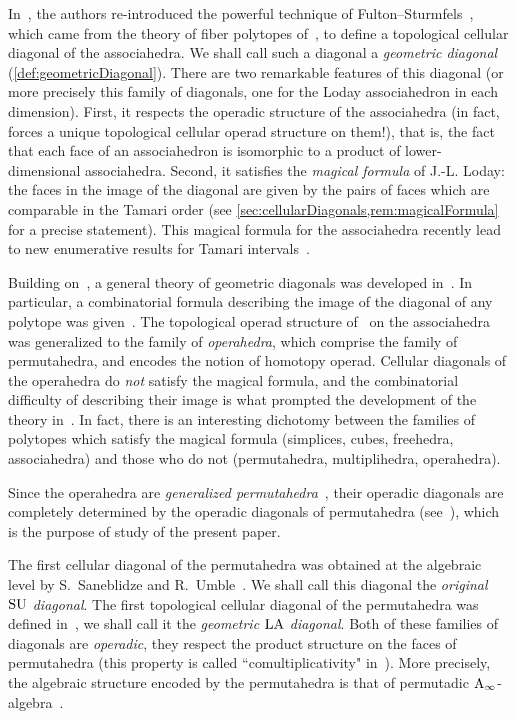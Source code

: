 In~\cite{MasudaThomasTonksVallette}, the authors re-introduced the powerful technique of Fulton--Sturmfels~\cite{FultonSturmfels}, which came from the theory of fiber polytopes of~\cite{BilleraSturmfels}, to define a topological cellular diagonal of the associahedra.
We shall call such a diagonal a \emph{geometric diagonal} (\cref{def:geometricDiagonal}).
There are two remarkable features of this diagonal (or more precisely this family of diagonals, one for the Loday associahedron in each dimension).
First, it respects the operadic structure of the associahedra (in fact, forces a unique topological cellular operad structure on them!), that is, the fact that each face of an associahedron is isomorphic to a product of lower-dimensional associahedra.
Second, it satisfies the \emph{magical formula} of J.-L. Loday: the faces in the image of the diagonal are given by the pairs of faces which are comparable in the Tamari order (see \cref{sec:cellularDiagonals,rem:magicalFormula} for a precise statement). 
This magical formula for the associahedra recently lead to new enumerative results for Tamari intervals~\cite{BostanChyzakPilaud}.

Building on~\cite{MasudaThomasTonksVallette}, a general theory of geometric diagonals was developed in~\cite{LaplanteAnfossi}.
In particular, a combinatorial formula describing the image of the diagonal of any polytope was given~\cite[Thm.~1.26]{LaplanteAnfossi}.
The topological operad structure of~\cite{MasudaThomasTonksVallette} on the associahedra was generalized to the family of \emph{operahedra}, which comprise the family of permutahedra, and encodes the notion of homotopy operad.
Cellular diagonals of the operahedra do \emph{not} satisfy the magical formula, and the combinatorial difficulty of describing their image is what prompted the development of the theory in~\cite{LaplanteAnfossi}.
In fact, there is an interesting dichotomy between the families of polytopes which satisfy the magical formula (simplices, cubes, freehedra, associahedra) and those who do not (permutahedra, multiplihedra, operahedra).

Since the operahedra are \emph{generalized permutahedra}~\cite{Postnikov}, their operadic diagonals are completely determined by the operadic diagonals of permutahedra (see~\cite[Sect.~1.6]{LaplanteAnfossi}), which is the purpose of study of the present paper.

The first cellular diagonal of the permutahedra was obtained at the algebraic level by S.~Sanebli\-dze and R.~Umble~\cite{SaneblidzeUmble}.
We shall call this diagonal the \emph{original $\mathrm{SU}$ diagonal}. 
The first topological cellular diagonal of the permutahedra was defined in~\cite{LaplanteAnfossi}, we shall call it the \emph{geometric $\mathrm{LA}$ diagonal}.
Both of these families of diagonals are \emph{operadic}, \ie they respect the product structure on the faces of permutahedra (this property is called ``comultiplicativity" in~\cite{SaneblidzeUmble}).
More precisely, the algebraic structure encoded by the permutahedra is that of permutadic $\mathrm{A}_\infty$-algebra~\cite{LodayRonco-permutads,Markl}.

